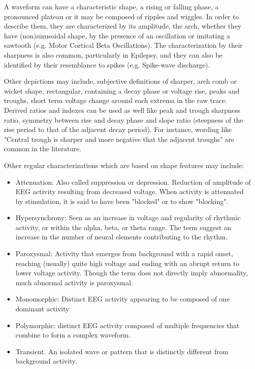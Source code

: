 \documentclass[sensors,article,submit,moreauthors,pdftex,10pt,a4paper]{mdpi}
\begin{document}
A waveform can have a characteristic shape, a rising or falling phase, a pronounced plateau or it may be composed of ripples and wiggles. In order to describe them, they are characterized by its amplitude, the arch, whether they have (non)sinusoidal shape, by the presence of an oscillation or imitating a sawtooth (e.g. Motor Cortical Beta Oscillations).  The characterization by their sharpness is also common, particularly in Epilepsy, and they can also be identified by their resemblance to spikes (e.g. Spike-wave discharge).

Other depictions may include, subjective definitions of sharper, arch comb or wicket shape, rectangular, containing a decay phase or voltage rise, peaks and troughs, short term voltage change around each extrema in the raw trace.  Derived ratios and indexes can be used as well like peak and trough sharpness ratio, symmetry between rise and decay phase and slope ratio (steepness of the rise period to that of the adjacent decay period).  For instance,  wording like "Central trough is sharper and more negative that the adjacent troughs" are common in the literature.

Other regular characterizations which are based on shape features may include:

\begin{itemize}
\item Attenuation: Also called suppression or depression. Reduction of amplitude of EEG activity resulting from decreased voltage. When activity is attenuated by stimulation, it is said to have been "blocked" or to show "blocking".
\item Hypersynchrony: Seen as an increase in voltage and regularity of rhythmic activity, or within the alpha, beta, or theta range. The term suggest an increase in the number of neural elements contributing to the rhythm.
\item Paroxysmal: Activity that emerges from background with a rapid onset, reaching (usually) quite high voltage and ending with an abrupt return to lower voltage activity. Though the term does not directly imply abnormality, much abnormal activity is paroxysmal.
\end{itemize}

\begin{itemize}
\item Monomorphic: Distinct EEG activity appearing to be composed of one dominant activity
\item Polymorphic: distinct EEG activity composed of multiple frequencies that combine to form a complex waveform.
\item Transient. An isolated wave or pattern that is distinctly different from background activity.
\end{itemize}
\end{document}
